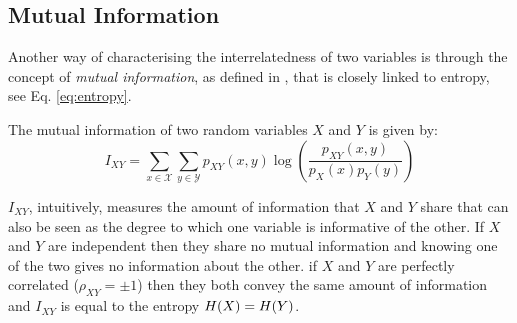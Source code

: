 \subsection{Mutual Information} \label{subsec:mutualinformation}
Another way of characterising the interrelatedness of two variables is through the concept of \textit{mutual information}, as defined in \cite{Cover2006}, that is closely linked to entropy, see Eq. \ref{eq:entropy}.
\begin{definition}
	The mutual information of two random variables $X$ and $Y$ is given by:
	\begin{equation}
		I_{XY} = \sum_{x \in \mathcal{X}} \sum_{y \in \mathcal{Y}} p_{XY}(x,y) \log \left( \frac{p_{XY}(x, y)}{p_{X}(x) p_{Y}(y)} \right)
	\end{equation}
\end{definition}
$I_{XY}$, intuitively, measures the amount of information that $X$ and $Y$ share that can also be seen as the degree to which one variable is informative of the other.
If $X$ and $Y$ are independent then they share no mutual information and knowing one of the two gives no information about the other.
if $X$ and $Y$ are perfectly correlated ($\rho_{XY}= \pm 1$) then they both convey the same amount of information and $I_{XY}$ is equal to the entropy $H(X) = H(Y)$.

